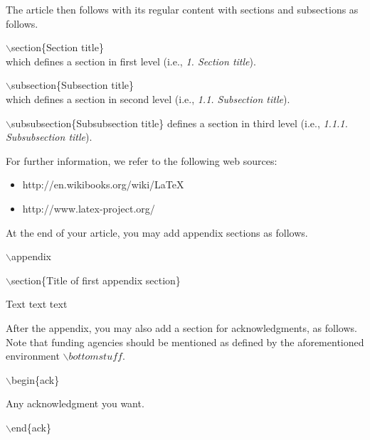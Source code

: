 \documentclass[kdmile,a4paper]{kdmile} %
\newenvironment{latexcode}
{\ttfamily\vspace{0.1in}\setlength{\parindent}{18pt}}
{\vspace{0.1in}}
\begin{document}

The article then follows with its regular content with sections and subsections as follows.

	\begin{latexcode}
		$\backslash$section\{Section title\} \\
		\rmfamily which defines a section in first level (i.e., \textit{1. Section title}).
	
		\ttfamily$\backslash$subsection\{Subsection title\} \\
		\rmfamily which defines a section in second level (i.e., \textit{1.1. Subsection title}).
	
		\ttfamily$\backslash$subsubsection\{Subsubsection title\} 
		\rmfamily defines a section in third level (i.e., \textit{1.1.1. Subsubsection title}).
	\end{latexcode}

	For further information, we refer to the following web sources:
	
	\ttfamily
\begin{itemize}
	\item http://en.wikibooks.org/wiki/LaTeX
	\item http://www.latex-project.org/
\end{itemize}
	
	\rmfamily


At the end of your article, you may add appendix sections as follows.

\begin{latexcode}
	$\backslash$appendix
	
	$\backslash$section\{Title of first appendix section\}

	Text text text
\end{latexcode}

After the appendix, you may also add a section for acknowledgments, as follows. Note that funding agencies should be mentioned as defined by the aforementioned environment $\backslash bottomstuff$.

\begin{latexcode}
				$\backslash$begin\{ack\}
				
				Any acknowledgment you want.
				
				$\backslash$end\{ack\}
\end{latexcode}
\end{document}

